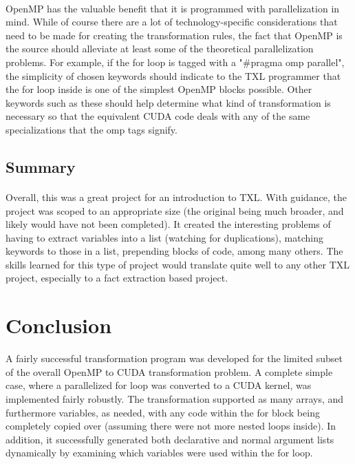 \documentclass{article}
\begin{document}
\paragraph{}
OpenMP has the valuable benefit that it is programmed with parallelization in mind. While of course there are a lot of technology-specific considerations that need to be made for creating the transformation rules, the fact that OpenMP is the source should alleviate at least some of the theoretical parallelization problems. For example, if the for loop is tagged with a "\#pragma omp parallel", the simplicity of chosen keywords should indicate to the TXL programmer that the for loop inside is one of the simplest OpenMP blocks possible. Other keywords such as these should help determine what kind of transformation is necessary so that the equivalent CUDA code deals with any of the same specializations that the omp tags signify.

\subsection{Summary}
\paragraph{}
Overall, this was a great project for an introduction to TXL. With guidance, the project was scoped to an appropriate size (the original being much broader, and likely would have not been completed). It created the interesting problems of having to extract variables into a list (watching for duplications), matching keywords to those in a list, prepending blocks of code, among many others. The skills learned for this type of project would translate quite well to any other TXL project, especially to a fact extraction based project.

\section{Conclusion}
A fairly successful transformation program was developed for the limited subset of the overall OpenMP to CUDA transformation problem. A complete simple case, where a parallelized for loop was converted to a CUDA kernel, was implemented fairly robustly. The transformation supported as many arrays, and furthermore variables, as needed, with any code within the for block being completely copied over (assuming there were not more nested loops inside). In addition, it successfully generated both declarative and normal argument lists dynamically by examining which variables were used within the for loop.
\end{document}
